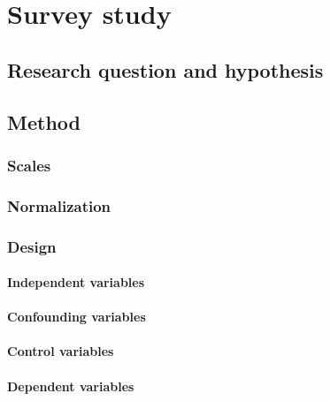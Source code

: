\chapter{Survey study}

\section{Research question and hypothesis}

\section{Method}
\subsection{Scales}

\subsection{Normalization}

\subsection{Design}
\subsubsection{Independent variables}
\subsubsection{Confounding variables}
\subsubsection{Control variables}
\subsubsection{Dependent variables}

